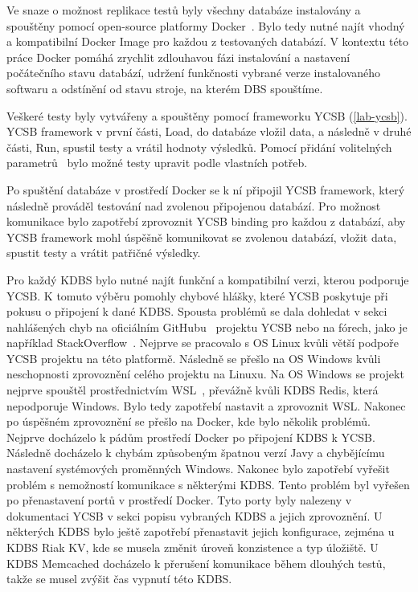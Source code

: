 \documentclass[czech,master,dept460,male,csharp,cpdeclaration]{diploma}
\begin{document}
	Ve snaze o možnost replikace testů byly všechny databáze instalovány a spouštěny pomocí open-source platformy Docker~\cite{docker}. Bylo tedy nutné najít vhodný a kompatibilní Docker Image pro každou z testovaných databází. V kontextu této práce Docker pomáhá zrychlit zdlouhavou fázi instalování a nastavení počátečního stavu databází, udržení funkčnosti vybrané verze instalovaného softwaru a odstínění od stavu stroje, na kterém DBS spouštíme.
	
	Veškeré testy byly vytvářeny a spouštěny pomocí frameworku YCSB (\ref{lab-ycsb}). YCSB framework v první části, Load, do databáze vložil data, a následně v druhé části, Run, spustil testy a vrátil hodnoty výsledků. Pomocí přidání volitelných parametrů~\cite{ycsb-properties} bylo možné testy upravit podle vlastních potřeb.
	
	Po spuštění databáze v prostředí Docker se k ní připojil YCSB framework, který následně prováděl testování nad zvolenou připojenou databází. Pro možnost komunikace bylo zapotřebí zprovoznit YCSB binding pro každou z databází, aby YCSB framework mohl úspěšně komunikovat se zvolenou databází, vložit data, spustit testy a vrátit patřičné výsledky. 
	
	Pro každý KDBS bylo nutné najít funkční a kompatibilní verzi, kterou podporuje YCSB. K tomuto výběru pomohly chybové hlášky, které YCSB poskytuje při pokusu o připojení k dané KDBS. Spousta problémů se dala dohledat v sekci nahlášených chyb na oficiálním GitHubu~\cite{ycsb} projektu YCSB nebo na fórech, jako je například StackOverflow~\cite{stackoverflow-ycsb}. Nejprve se pracovalo s OS Linux kvůli větší podpoře YCSB projektu na této platformě. Následně se přešlo na OS Windows kvůli neschopnosti zprovoznění celého projektu na Linuxu. Na OS Windows se projekt nejprve spouštěl prostřednictvím WSL~\cite{wsl-microsoft}, převážně kvůli KDBS Redis, která nepodporuje Windows. Bylo tedy zapotřebí nastavit a zprovoznit WSL. Nakonec po úspěšném zprovoznění se přešlo na Docker, kde bylo několik problémů. Nejprve docházelo k pádům prostředí Docker po připojení KDBS k YCSB. Následně docházelo k chybám způsobeným špatnou verzí Javy a chybějícímu nastavení systémových proměnných Windows. Nakonec bylo zapotřebí vyřešit problém s nemožností komunikace s některými KDBS. Tento problém byl vyřešen po přenastavení portů v prostředí Docker. Tyto porty byly nalezeny v dokumentaci YCSB v sekci popisu vybraných KDBS a jejich zprovoznění. U některých KDBS bylo ještě zapotřebí přenastavit jejich konfigurace, zejména u KDBS Riak KV, kde se musela změnit úroveň konzistence a typ úložiště. U KDBS Memcached docházelo k přerušení komunikace během dlouhých testů, takže se musel zvýšit čas vypnutí této KDBS.
	
\end{document}
